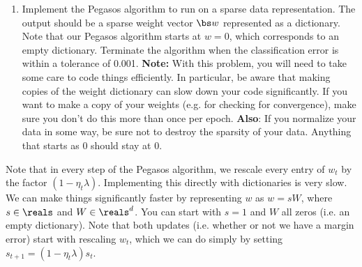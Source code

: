 \documentclass{article}
\theoremstyle{plain}
\theoremstyle{definition}
\begin{document}
\begin{enumerate}
  \setcounter{enumi}{\value{saveenum}}
\item Implement the Pegasos algorithm to run on a sparse data representation.
The output should be a sparse weight vector $\bs w$ represented as a dictionary. Note that our Pegasos
algorithm starts at $w=0$, which corresponds
to an empty dictionary. Terminate the algorithm when the classification error is within a tolerance of 0.001. \textbf{Note:} With this problem, you will
need to take some care to code things efficiently. In particular,
be aware that making copies of the weight dictionary can slow down
your code significantly. If you want to make a copy of your weights
(e.g. for checking for convergence), make sure you don't do this more
than once per epoch. \textbf{Also}: If you normalize your data in
some way, be sure not to destroy the sparsity of your data. Anything
that starts as $0$ should stay at $0$.\\
\setcounter{saveenum}{\value{enumi}}
\end{enumerate}
Note that in every step of the Pegasos algorithm, we rescale every
entry of $w_{t}$ by the factor $(1-\eta_{t}\lambda)$. Implementing
this directly with dictionaries is very slow. We can make things significantly
faster by representing $w$ as $w=sW$, where $s\in\reals$ and $W\in\reals^{d}$.
You can start with $s=1$ and $W$ all zeros (i.e. an empty dictionary).
Note that both updates (i.e. whether or not we have a margin error)
start with rescaling $w_{t}$, which we can do simply by setting $s_{t+1}=\left(1-\eta_{t}\lambda\right)s_{t}$.
\end{document}
